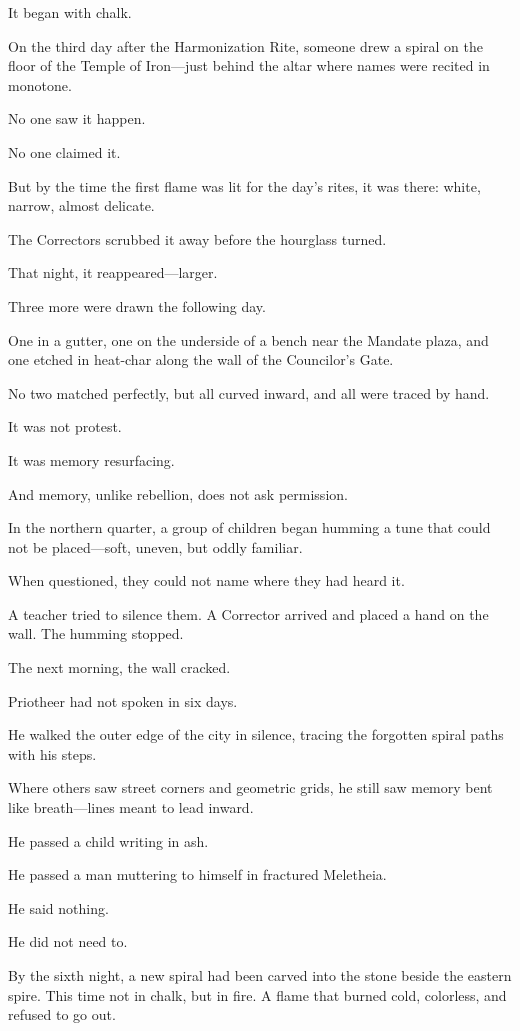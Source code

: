 \documentclass[12pt]{article}
\begin{document}
It began with chalk.

On the third day after the Harmonization Rite, someone drew a spiral on the floor of the Temple of Iron—just behind the altar where names were recited in monotone. 

No one saw it happen. 

No one claimed it. 

But by the time the first flame was lit for the day’s rites, it was there: white, narrow, almost delicate.

The Correctors scrubbed it away before the hourglass turned.

That night, it reappeared—larger.

Three more were drawn the following day. 

One in a gutter, one on the underside of a bench near the Mandate plaza, and one etched in heat-char along the wall of the Councilor’s Gate. 

No two matched perfectly, but all curved inward, and all were traced by hand.

It was not protest. 

It was memory resurfacing. 

And memory, unlike rebellion, does not ask permission.

In the northern quarter, a group of children began humming a tune that could not be placed—soft, uneven, but oddly familiar. 

When questioned, they could not name where they had heard it. 

A teacher tried to silence them. A Corrector arrived and placed a hand on the wall. The humming stopped.

The next morning, the wall cracked.

Priotheer had not spoken in six days. 

He walked the outer edge of the city in silence, tracing the forgotten spiral paths with his steps. 

Where others saw street corners and geometric grids, he still saw memory bent like breath—lines meant to lead inward.

He passed a child writing in ash. 

He passed a man muttering to himself in fractured Meletheia. 

He said nothing. 

He did not need to.

By the sixth night, a new spiral had been carved into the stone beside the eastern spire. This time not in chalk, but in fire. A flame that burned cold, colorless, and refused to go out.
\end{document}

